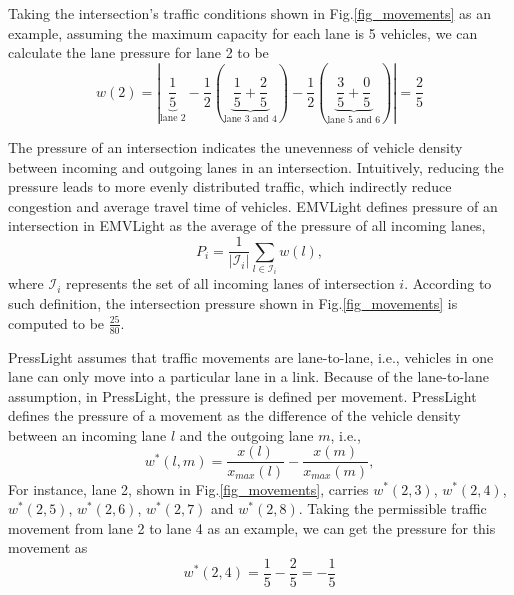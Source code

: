 Taking the intersection's traffic conditions shown in Fig.\ref{fig_movements} as an example, assuming the maximum capacity for each lane is 5 vehicles, we can calculate the lane pressure for lane 2 to be
\begin{equation*}
    w(2) = \left| \underbrace{\frac{1}{5}}_{\textrm{lane 2}} - \frac{1}{2}(\underbrace{\frac{1}{5} + \frac{2}{5}}_{\textrm{lane 3 and 4}}) - \frac{1}{2}(\underbrace{\frac{3}{5} + \frac{0}{5}}_{\textrm{lane 5 and 6}})\right| = \frac{2}{5}
\end{equation*}



The pressure of an intersection indicates the unevenness of vehicle density between incoming and outgoing lanes in an intersection. Intuitively, reducing the pressure leads to more evenly distributed traffic, which indirectly reduce congestion and average travel time of vehicles. EMVLight defines pressure of an intersection in EMVLight as the average of the pressure of all incoming lanes,
\begin{equation*}\label{eq:EMVLight_pressure}
    P_{i} = \frac{1}{|\mathcal{I}_i|}\sum _{l\in \mathcal{I}_i} w(l),
\end{equation*}
where $\mathcal{I}_i$ represents the set of all incoming lanes of intersection $i$. According to such definition, the intersection pressure shown in Fig.\ref{fig_movements} is computed to be $\frac{25}{80}$.

PressLight \cite{wei2019presslight} assumes that traffic movements are lane-to-lane, i.e., vehicles in one lane can only move into a particular lane in a link. Because of the lane-to-lane assumption, in PressLight, the pressure is defined per movement. PressLight defines the pressure of a movement as the difference of the vehicle density between an incoming lane $l$ and the outgoing lane $m$, i.e., 
\begin{equation*}
    w^{*}(l, m) = \frac{x(l)}{x_{max}(l)} - \frac{x(m)}{x_{max}(m)},
\end{equation*}
For instance, lane 2, shown in Fig.\ref{fig_movements}, carries $w^{*}(2, 3)$, $w^{*}(2, 4)$, $w^{*}(2, 5)$, $w^{*}(2, 6)$, $w^{*}(2, 7)$ and $w^{*}(2, 8)$. Taking the permissible traffic movement from lane 2 to lane 4 as an example, we can get the pressure for this movement as
\begin{equation*}
    w^{*}(2, 4) = \frac{1}{5} - \frac{2}{5} = -\frac{1}{5}
\end{equation*}

